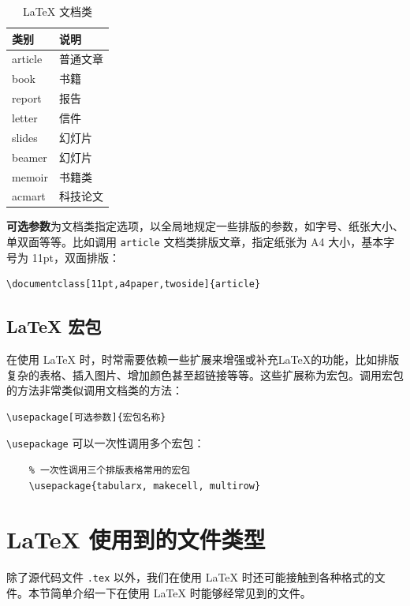 \begin{table}[!h]
    \centering
    \caption{\LaTeX{} 文档类}
    \label{tab:latex_doc_class}
    \begin{tabular}{ll}
        \toprule
        类别      & 说明   \\
        \midrule
        article & 普通文章 \\
        book    & 书籍   \\
        report  & 报告   \\
        \hline
        letter  & 信件   \\
        slides  & 幻灯片  \\
        beamer  & 幻灯片  \\
        memoir  & 书籍类  \\
        acmart  & 科技论文 \\
        \bottomrule
    \end{tabular}
\end{table}

{\bf 可选参数}为文档类指定选项，以全局地规定一些排版的参数，如字号、纸张大小、单双面等等。比如调用 \lstinline{article} 文档类排版文章，指定纸张为 A4 大小，基本字号为 11pt，双面排版：
\begin{lstlisting}
\documentclass[11pt,a4paper,twoside]{article}
\end{lstlisting}

\subsection{\LaTeX{} 宏包}\label{subsec:latexpackage}
在使用 \LaTeX{} 时，时常需要依赖一些扩展来增强或补充\LaTeX{}的功能，比如排版复杂的表格、插入图片、增加颜色甚至超链接等等。这些扩展称为宏包。调用宏包的方法非常类似调用文档类的方法：
\begin{lstlisting}
\usepackage[可选参数]{宏包名称}
\end{lstlisting}
\lstinline{\usepackage} 可以一次性调用多个宏包：

\begin{lstlisting}
    % 一次性调用三个排版表格常用的宏包
    \usepackage{tabularx, makecell, multirow}
\end{lstlisting}

\section{\LaTeX{} 使用到的文件类型}\label{sec:latexfiletypes}

除了源代码文件 \lstinline{.tex} 以外，我们在使用 \LaTeX{} 时还可能接触到各种格式的文件。本节简单介绍一下在使用 \LaTeX{} 时能够经常见到的文件。

